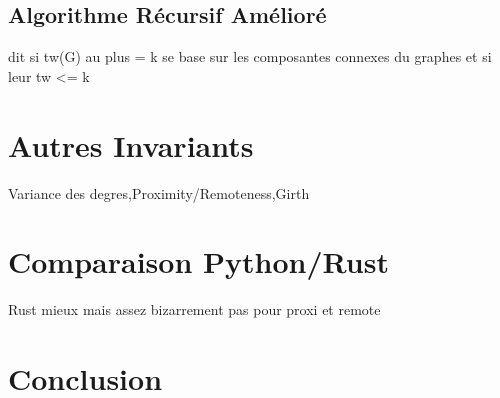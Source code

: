 \documentclass[a4paper, 12pt]{article}
\begin{document}
\subsection{Algorithme Récursif Amélioré}
dit si tw(G) au plus = k
se base sur les composantes connexes du graphes et si leur tw <= k


\section{Autres Invariants}
Variance des degres,Proximity/Remoteness,Girth
\section{Comparaison Python/Rust}
Rust mieux mais assez bizarrement pas pour proxi et remote
\section{Conclusion}
\end{document}
